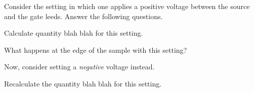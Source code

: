 Consider the setting in which one applies a positive voltage between
the source and the gate leeds. Answer the following questions.
\begin{exenumerate}
\item %
    Calculate quantity blah blah for this setting.

\item %
    What happens at the edge of the sample with this setting?

\end{exenumerate}

Now, consider setting a {\em negative} voltage instead.
\begin{exenumerate}
\item %
    Recalculate the quantity blah blah for this setting.

\end{exenumerate}
